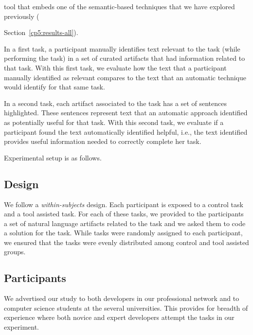  tool that embeds one of the semantic-based techniques that we have explored previously ({Section~\ref{cp5:results-all}). 


In a first task, a participant manually identifies text relevant to the task (while performing the task)
in a set of curated artifacts that had information related to that task.
With this first task, we evaluate how the text that a participant manually identified as relevant
compares to the text that an automatic technique would identify for that same task. 



In a second task, each artifact associated to the task has a set of sentences highlighted. These 
sentences represent text that an automatic approach identified as potentially useful for that task. 
With this second task, we evaluate if a participant found the text automatically identified helpful, i.e., the text identified provides useful information needed to correctly complete her task.


Experimental setup is as follows.








\subsection{Design}


We follow a \textit{within-subjects} design. Each participant is exposed to a control task and a tool assisted task. For each of these tasks, we provided to the participants a set of natural language artifacts related to the task
and we asked them to code a solution for the task. While tasks were randomly assigned to each participant, 
we ensured that the tasks were evenly distributed among control and tool assisted groups. 






\subsection{Participants}



We advertised our study to both developers in our professional network and to computer science students at the several universities. 
This provides for breadth of experience where both novice and expert developers attempt the tasks in our experiment. 


}
